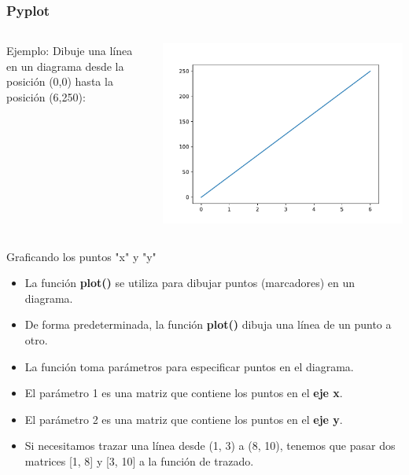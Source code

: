 \begin{frame}[fragile]
  \frametitle{Pyplot}

  \begin{columns}
        \begin{exampleblock}{Ejemplo:}
          Dibuje una línea en un diagrama desde la posición
          (0,0) hasta la posición (6,250):
          
        \end{exampleblock}
      \pausa
      \begin{center}
          \includegraphics[scale=0.5]{ejemplos/e01.pdf}
      \end{center}
  \end{columns}
\end{frame}

\begin{frame}[c]{Graficando los puntos "x" y "y"}
  \begin{itemize}
    \item La función \textbf{plot()} se utiliza para dibujar puntos
      (marcadores) en un diagrama.
    \pausa
    \item De forma predeterminada, la función \textbf{plot()} dibuja
      una línea de un punto a otro.
    \pausa
    \item La función toma parámetros para especificar puntos en el diagrama.
    \pausa
    \item El parámetro 1 es una matriz que contiene los puntos en el
      \textbf{eje x}.
    \pausa
    \item El parámetro 2 es una matriz que contiene los puntos en el
      \textbf{eje y}.
    \pausa
    \item Si necesitamos trazar una línea desde (1, 3) a (8, 10),
      tenemos que pasar dos matrices [1, 8] y [3, 10] a la función de trazado.
  \end{itemize}
\end{frame}


